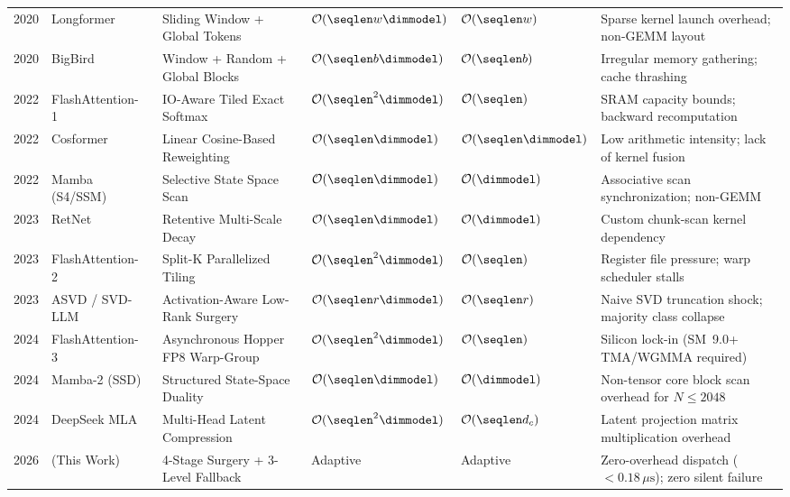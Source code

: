 \begin{table}[t]
{\begin{tabular}{@{}llllll@{}}
2020 & Longformer~\cite{beltagy2020longformer} & Sliding Window + Global Tokens & $\mathcal{O}(\seqlen w \dimmodel)$ & $\mathcal{O}(\seqlen w)$ & Sparse kernel launch overhead; non-GEMM layout \\
2020 & BigBird~\cite{zaheer2020bigbird} & Window + Random + Global Blocks & $\mathcal{O}(\seqlen b \dimmodel)$ & $\mathcal{O}(\seqlen b)$ & Irregular memory gathering; cache thrashing \\
2022 & FlashAttention-1~\cite{dao2022flashattention} & IO-Aware Tiled Exact Softmax & $\mathcal{O}(\seqlen^2 \dimmodel)$ & $\mathcal{O}(\seqlen)$ & SRAM capacity bounds; backward recomputation \\
2022 & Cosformer~\cite{qin2022cosformer} & Linear Cosine-Based Reweighting & $\mathcal{O}(\seqlen \dimmodel)$ & $\mathcal{O}(\seqlen \dimmodel)$ & Low arithmetic intensity; lack of kernel fusion \\
2022 & Mamba (S4/SSM)~\cite{gu2021efficiently,gu2022mamba} & Selective State Space Scan & $\mathcal{O}(\seqlen \dimmodel)$ & $\mathcal{O}(\dimmodel)$ & Associative scan synchronization; non-GEMM \\
2023 & RetNet~\cite{sun2023retentive} & Retentive Multi-Scale Decay & $\mathcal{O}(\seqlen \dimmodel)$ & $\mathcal{O}(\dimmodel)$ & Custom chunk-scan kernel dependency \\
2023 & FlashAttention-2~\cite{dao2023flashattention2} & Split-K Parallelized Tiling & $\mathcal{O}(\seqlen^2 \dimmodel)$ & $\mathcal{O}(\seqlen)$ & Register file pressure; warp scheduler stalls \\
2023 & ASVD / SVD-LLM~\cite{yuan2023asvd,wang2024svdllm} & Activation-Aware Low-Rank Surgery & $\mathcal{O}(\seqlen r \dimmodel)$ & $\mathcal{O}(\seqlen r)$ & Naive SVD truncation shock; majority class collapse \\
2024 & FlashAttention-3~\cite{shah2024flashattention3} & Asynchronous Hopper FP8 Warp-Group & $\mathcal{O}(\seqlen^2 \dimmodel)$ & $\mathcal{O}(\seqlen)$ & Silicon lock-in (SM~9.0+ TMA/WGMMA required) \\
2024 & Mamba-2 (SSD)~\cite{dao2024mamba2} & Structured State-Space Duality & $\mathcal{O}(\seqlen \dimmodel)$ & $\mathcal{O}(\dimmodel)$ & Non-tensor core block scan overhead for $N \le 2048$ \\
2024 & DeepSeek MLA~\cite{deepseek2024mla} & Multi-Head Latent Compression & $\mathcal{O}(\seqlen^2 \dimmodel)$ & $\mathcal{O}(\seqlen d_c)$ & Latent projection matrix multiplication overhead \\
2026 & \neuralops{} (This Work) & 4-Stage Surgery + 3-Level Fallback & Adaptive & Adaptive & Zero-overhead dispatch ($<0.18\,\mu\text{s}$); zero silent failure \\
\bottomrule
\end{tabular}%
}
\end{table}

